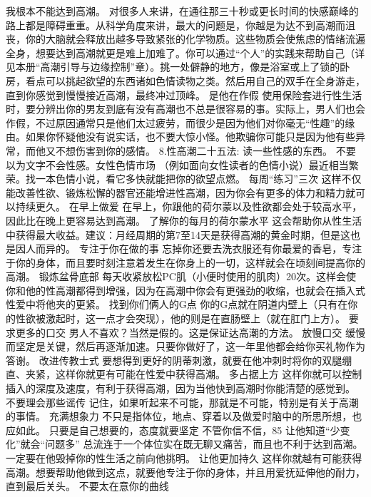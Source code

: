 \documentclass[12pt,UTF8,openany]{ctexbook}
\begin{document}
我根本不能达到高潮。
对很多人来讲，在通往那三十秒或更长时间的快感巅峰的路上都是障碍重重。从科学角度来讲，最大的问题是，你越是为达不到高潮而沮丧，你的大脑就会释放出越多导致紧张的化学物质。这些物质会使焦虑的情绪流遍全身，想要达到高潮就更是难上加难了。你可以通过“个人”的实践来帮助自己（详见本册“高潮引导与边缘控制”章）。挑一处僻静的地方，像是浴室或上了锁的卧房，看点可以挑起欲望的东西诸如色情读物之类。然后用自己的双手在全身游走，直到你感觉到慢慢接近高潮，最终冲过顶峰。
是他在作假
使用保险套进行性生活时，要分辨出你的男友到底有没有高潮也不总是很容易的事。实际上，男人们也会作假，不过原因通常只是他们太过疲劳，而很少是因为他们对你毫无“性趣”的缘由。如果你怀疑他没有说实话，也不要大惊小怪。他欺骗你可能只是因为他有些异常，而他又不想伤害到你的感情。
8.性高潮二十五法:
读一些性感的东西。
不要以为文字不会性感。女性色情市场 （例如面向女性读者的色情小说）最近相当繁荣。找一本色情小说，看它多快就能把你的欲望点燃。
每周“练习”三次
这样不仅能改善性欲、锻炼松懈的器官还能增进性高潮，因为你会有更多的体力和精力就可以持续更久。
在早上做爱
在早上，你跟他的荷尔蒙以及性欲都会处于较高水平，因此比在晚上更容易达到高潮。
了解你的每月的荷尔蒙水平
这会帮助你从性生活中获得最大收益。建议：月经周期的第7至14天是获得高潮的黄金时期，但是这也是因人而异的。
专注于你在做的事
忘掉你还要去洗衣服还有你最爱的香皂，专注于你的身体，而且要时刻注意着发生在你身上的一切，这样就会在顷刻间提高你的高潮。
锻炼盆骨底部
每天收紧放松PC肌（小便时使用的肌肉）20次。这样会使你和他的性高潮都得到增强，因为在高潮中你会有更强劲的收缩，也就会在插入式性爱中将他夹的更紧。
找到你们俩人的G点
你的G点就在阴道内壁上（只有在你的性欲被激起时，这一点才会突现），他的则是在直肠壁上（就在肛门上方）。
要求更多的口交
男人不喜欢？当然是假的。这是保证达高潮的方法。
放慢口交
缓慢而坚定是关键，然后再逐渐加速。只要你做好了，这一年里他都会给你买礼物作为答谢。
改进传教士式
要想得到更好的阴蒂刺激，就要在他冲刺时将你的双腿绷直、夹紧，这样你就更有可能在性爱中获得高潮。
多占据上方
这样你就可以控制插入的深度及速度，有利于获得高潮，因为当他快到高潮时你能清楚的感觉到。
不要理会那些谣传
记住，如果听起来不可能，那就是不可能，特别是有关于高潮的事情。
充满想象力
不只是指体位，地点、穿着以及做爱时脑中的所思所想，也应如此。
只要是自己想要的，态度就要坚定
不管你信不信，85%
让他知道“少变化”就会“问题多”
总流连于一个体位实在既无聊又痛苦，而且也不利于达到高潮。一定要在他毁掉你的性生活之前向他挑明。
让他更加持久
这样你就越有可能获得高潮。想要帮助他做到这点，就要他专注于你的身体，并且用爱抚延伸他的耐力，直到最后关头。
不要太在意你的曲线
\end{document}
